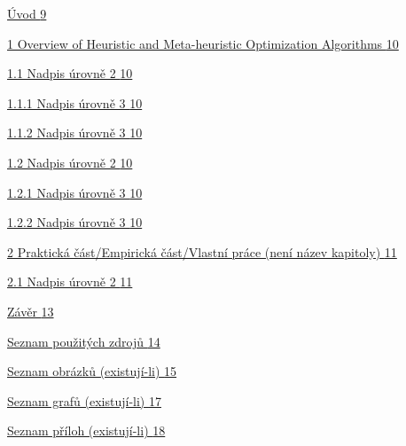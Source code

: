 \documentclass[
]{article}
\begin{document}
\protect\hyperlink{uxfavod}{Úvod \protect\hyperlink{uxfavod}{9}}

\protect\hyperlink{teoretickuxe1-ux10duxe1st-nenuxed-nuxe1zev-kapitoly}{1
Overview of Heuristic and Meta-heuristic Optimization Algorithms
\protect\hyperlink{teoretickuxe1-ux10duxe1st-nenuxed-nuxe1zev-kapitoly}{10}}

\protect\hyperlink{nadpis-uxfarovnux11b-2}{1.1 Nadpis úrovně 2
\protect\hyperlink{nadpis-uxfarovnux11b-2}{10}}

\protect\hyperlink{nadpis-uxfarovnux11b-3}{1.1.1 Nadpis úrovně 3
\protect\hyperlink{nadpis-uxfarovnux11b-3}{10}}

\protect\hyperlink{nadpis-uxfarovnux11b-3-1}{1.1.2 Nadpis úrovně 3
\protect\hyperlink{nadpis-uxfarovnux11b-3-1}{10}}

\protect\hyperlink{nadpis-uxfarovnux11b-2-1}{1.2 Nadpis úrovně 2
\protect\hyperlink{nadpis-uxfarovnux11b-2-1}{10}}

\protect\hyperlink{nadpis-uxfarovnux11b-3-2}{1.2.1 Nadpis úrovně 3
\protect\hyperlink{nadpis-uxfarovnux11b-3-2}{10}}

\protect\hyperlink{nadpis-uxfarovnux11b-3-3}{1.2.2 Nadpis úrovně 3
\protect\hyperlink{nadpis-uxfarovnux11b-3-3}{10}}

\protect\hyperlink{praktickuxe1-ux10duxe1stempirickuxe1-ux10duxe1stvlastnuxed-pruxe1ce-nenuxed-nuxe1zev-kapitoly}{2
Praktická část/Empirická část/Vlastní práce (není název kapitoly)
\protect\hyperlink{praktickuxe1-ux10duxe1stempirickuxe1-ux10duxe1stvlastnuxed-pruxe1ce-nenuxed-nuxe1zev-kapitoly}{11}}

\protect\hyperlink{nadpis-uxfarovnux11b-2-2}{2.1 Nadpis úrovně 2
\protect\hyperlink{nadpis-uxfarovnux11b-2-2}{11}}

\protect\hyperlink{zuxe1vux11br}{Závěr
\protect\hyperlink{zuxe1vux11br}{13}}

\protect\hyperlink{seznam-pouux17eituxfdch-zdrojux16f}{Seznam použitých
zdrojů \protect\hyperlink{seznam-pouux17eituxfdch-zdrojux16f}{14}}

\protect\hyperlink{seznam-obruxe1zkux16f-existujuxed-li}{Seznam obrázků
(existují-li)
\protect\hyperlink{seznam-obruxe1zkux16f-existujuxed-li}{15}}

\protect\hyperlink{seznam-grafux16f-existujuxed-li}{Seznam grafů
(existují-li) \protect\hyperlink{seznam-grafux16f-existujuxed-li}{17}}

\protect\hyperlink{seznam-pux159uxedloh-existujuxed-li}{Seznam příloh
(existují-li)
\protect\hyperlink{seznam-pux159uxedloh-existujuxed-li}{18}}
\end{document}
